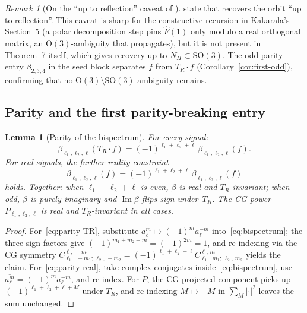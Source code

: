 \documentclass[11pt]{article}
\theoremstyle{plain}
\newtheorem{lemma}[theorem]{Lemma}
\theoremstyle{definition}
\theoremstyle{remark}
\newtheorem{remark}[theorem]{Remark}
\DeclareMathOperator{\im}{Im}
\newcommand{\SO}{\mathrm{SO}}
\newcommand{\OG}{\mathrm{O}}
\newcommand{\CG}[6]{C^{#5,\,#6}_{#1,\,#2;\,#3,\,#4}}
\newcommand{\abs}[1]{\lvert #1 \rvert}
\newcommand{\conj}[1]{\overline{#1}}
\begin{document}
\begin{remark}[On the ``up to reflection'' caveat of \citet{edidin2024orbit}]
\label{rem:edidin}
\citet[Section~1]{edidin2024orbit} state that
\citep{kakarala2012bispectrum} recovers the orbit ``up to reflection''.
This caveat is sharp for the constructive recursion in Kakarala's
Section~5 (a polar decomposition step pins $\hat F(1)$ only modulo a
real orthogonal matrix, an $\OG(3)$-ambiguity that propagates), but it
is not present in Theorem~7 itself, which gives recovery up to
$N_H \subset \SO(3)$. The odd-parity entry $\beta_{2,3,4}$ in the
seed block separates $f$ from $T_R\cdot f$
(Corollary~\ref{cor:first-odd}), confirming that no $\OG(3)\setminus\SO(3)$
ambiguity remains.
\end{remark}

\subsection{Parity and the first parity-breaking entry}
\label{sec:cgpower-formal}

\begin{lemma}[Parity of the bispectrum]\label{lem:parity}
For every signal:
\begin{equation}\label{eq:parity-TR}
  \beta_{\ell_1,\ell_2,\ell}(T_R\cdot f)
  = (-1)^{\ell_1+\ell_2+\ell}\, \beta_{\ell_1,\ell_2,\ell}(f).
\end{equation}
For real signals, the further reality constraint
\begin{equation}\label{eq:parity-real}
  \conj{\beta_{\ell_1,\ell_2,\ell}(f)}
  = (-1)^{\ell_1+\ell_2+\ell}\, \beta_{\ell_1,\ell_2,\ell}(f)
\end{equation}
holds. Together: when $\ell_1{+}\ell_2{+}\ell$ is even, $\beta$ is real
and $T_R$-invariant; when odd, $\beta$ is purely imaginary and
$\im\beta$ flips sign under~$T_R$. The CG power $P_{\ell_1,\ell_2,\ell}$
is real and $T_R$-invariant in all cases.
\end{lemma}
\begin{proof}
For~\eqref{eq:parity-TR}, substitute $a_\ell^m \mapsto (-1)^m a_\ell^{-m}$
into~\eqref{eq:bispectrum}; the three sign factors give
$(-1)^{m_1+m_2+m} = (-1)^{2m} = 1$, and re-indexing via the CG symmetry
$\CG{\ell_1}{-m_1}{\ell_2}{-m_2}{\ell}{-m} = (-1)^{\ell_1+\ell_2-\ell}
\CG{\ell_1}{m_1}{\ell_2}{m_2}{\ell}{m}$ yields the claim.
For~\eqref{eq:parity-real}, take complex conjugates inside~\eqref{eq:bispectrum},
use $\conj{a_\ell^m} = (-1)^m a_\ell^{-m}$, and re-index.
For $P$, the CG-projected component picks up
$(-1)^{\ell_1+\ell_2+\ell+M}$ under $T_R$, and re-indexing $M \mapsto -M$
in $\sum_M\abs{\cdot}^2$ leaves the sum unchanged.
\end{proof}
\end{document}
